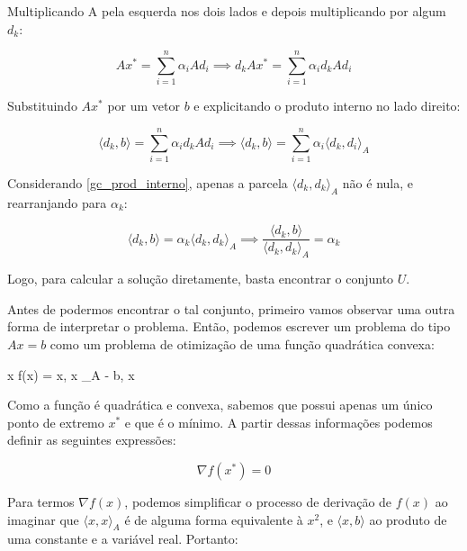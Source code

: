 Multiplicando A pela esquerda nos dois lados e depois multiplicando por algum \(d_k\):

\begin{equation}
Ax^* = \sum_{i=1}^n \alpha_i Ad_i \implies  d_k A x^* = \sum_{i=1}^n \alpha_i d_k A d_i
\end{equation}

Substituindo \(Ax^*\) por um vetor \(b\) e explicitando o produto interno no lado direito:

\begin{equation}
  \langle d_k, b \rangle = \sum_{i=1}^n \alpha_i d_k A d_i \implies \langle d_k, b \rangle = \sum_{i=1}^n \alpha_i \langle d_k ,d_i \rangle_A  
\end{equation}

Considerando \ref{gc_prod_interno}, apenas a parcela \( \langle d_k, d_k \rangle_A \) não é nula, e rearranjando para
\(\alpha_k\):

\begin{equation}
\langle d_k, b \rangle  = \alpha_k \langle d_k , d_k \rangle_A \implies \frac{\langle d_k, b \rangle}{\langle d_k , d_k \rangle_A} = \alpha_k
\end{equation}

Logo, para calcular a solução diretamente, basta encontrar o conjunto \(U\).

Antes de podermos encontrar o tal conjunto, primeiro vamos observar uma outra forma de
interpretar o problema. Então, podemos escrever um problema do tipo \(Ax = b\) como um
problema de otimização de uma função quadrática convexa:

\vspace{-15pt}
\begin{mini!}
{x}{ f(x) =  \langle x, x \rangle_A - \langle b, x \rangle \label{gcq_obj}}{\label{prob_gcq}}{}
\end{mini!}

Como a função é quadrática e convexa, sabemos que possui apenas um único ponto de
extremo \(x^*\) e que é o mínimo. A partir dessas informações podemos definir as
seguintes expressões:

\begin{equation}
\nabla f(x^*) = 0
\end{equation}

Para termos \(\nabla f(x)\), podemos simplificar o processo de derivação de \(f(x)\) ao imaginar
que \(\langle x, x \rangle_A\) é de alguma forma equivalente à \(x^2\), e \(\langle x, b \rangle\)
ao produto de uma constante e a variável real. Portanto:

